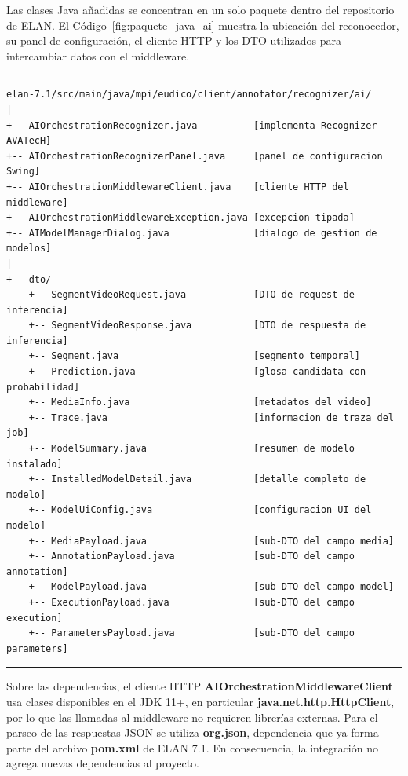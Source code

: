Las clases Java añadidas se concentran en un solo paquete dentro del repositorio de ELAN. El Código~\ref{fig:paquete_java_ai} muestra la ubicación del reconocedor, su panel de configuración, el cliente HTTP y los DTO utilizados para intercambiar datos con el middleware.

\begin{center}
\begin{minipage}{0.96\textwidth}
\hrule
\vspace{0.06cm}
\scriptsize
\begin{Verbatim}[baselinestretch=0.68]
elan-7.1/src/main/java/mpi/eudico/client/annotator/recognizer/ai/
|
+-- AIOrchestrationRecognizer.java          [implementa Recognizer AVATecH]
+-- AIOrchestrationRecognizerPanel.java     [panel de configuracion Swing]
+-- AIOrchestrationMiddlewareClient.java    [cliente HTTP del middleware]
+-- AIOrchestrationMiddlewareException.java [excepcion tipada]
+-- AIModelManagerDialog.java               [dialogo de gestion de modelos]
|
+-- dto/
    +-- SegmentVideoRequest.java            [DTO de request de inferencia]
    +-- SegmentVideoResponse.java           [DTO de respuesta de inferencia]
    +-- Segment.java                        [segmento temporal]
    +-- Prediction.java                     [glosa candidata con probabilidad]
    +-- MediaInfo.java                      [metadatos del video]
    +-- Trace.java                          [informacion de traza del job]
    +-- ModelSummary.java                   [resumen de modelo instalado]
    +-- InstalledModelDetail.java           [detalle completo de modelo]
    +-- ModelUiConfig.java                  [configuracion UI del modelo]
    +-- MediaPayload.java                   [sub-DTO del campo media]
    +-- AnnotationPayload.java              [sub-DTO del campo annotation]
    +-- ModelPayload.java                   [sub-DTO del campo model]
    +-- ExecutionPayload.java               [sub-DTO del campo execution]
    +-- ParametersPayload.java              [sub-DTO del campo parameters]
\end{Verbatim}
\vspace{0.03cm}
\hrule

\label{fig:paquete_java_ai}
\end{minipage}
\end{center}

Sobre las dependencias, el cliente HTTP \textbf{AIOrchestrationMiddlewareClient} usa clases disponibles en el JDK 11+, en particular \textbf{java.net.http.HttpClient}, por lo que las llamadas al middleware no requieren librerías externas. Para el parseo de las respuestas JSON se utiliza \textbf{org.json}, dependencia que ya forma parte del archivo \textbf{pom.xml} de ELAN 7.1. En consecuencia, la integración no agrega nuevas dependencias al proyecto.

